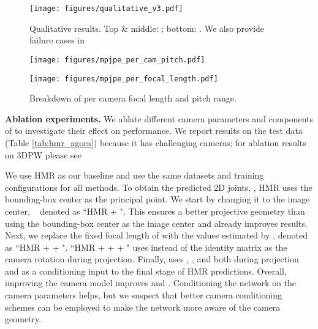 \documentclass[10pt,twocolumn,letterpaper,usenames,dvipsnames]{article}
\begin{document}
\begin{figure*}[h]
    \centering
    \texttt{[image: figures/qualitative\_v3.pdf]}
    \vspace{-0.1in}
    \caption{Qualitative results. Top \& middle: \mtpcam; bottom: \agoracam. We also provide failure cases in \supmat 
}
    \label{fig:qualitative}
    \vspace{-2ex}
\end{figure*}

\begin{figure}[h]
    \centering
    \begin{minipage}{.25\textwidth}
        \centering
        \texttt{[image: figures/mpjpe\_per\_cam\_pitch.pdf]}
\end{minipage}\begin{minipage}{.25\textwidth}
        \centering
        \texttt{[image: figures/mpjpe\_per\_focal\_length.pdf]}
\end{minipage}\vspace{-0.1in}
    \caption{Breakdown of \wmpjpe per camera focal length and pitch range.}
    \label{fig:error_breakdown}
    \vspace{-3ex}
\end{figure}

\textbf{Ablation experiments.} We ablate different camera parameters and components of \methodname to investigate their effect on performance. 
We report results on the \agoracam test data (Table \ref{tab:hmr_agora}) because it has challenging cameras; for ablation results on 3DPW please see \supmat 

We use HMR as our baseline and use the same datasets and training configurations for all methods. 
To obtain the predicted 2D joints, , HMR uses the bounding-box center as the principal point. 
We start by changing it to the image center, \ie~ denoted as ``HMR + ". 
This ensures a better projective geometry than using the bounding-box center as the image center and already improves results. 
Next, we replace the fixed focal length of  with the values estimated by \camcalib, denoted as ``HMR +  + ". 
``HMR +  +  + " uses  instead of the identity matrix as the camera rotation during projection. 
Finally, \methodname uses , , and  both during projection and as a conditioning input to the final stage of HMR predictions. 
Overall, improving the camera model improves  \wmpjpe and \wpve. 
Conditioning the network on the camera parameters helps, but we suspect that better camera conditioning schemes can be employed to make the network more aware of the camera geometry. 
\end{document}
